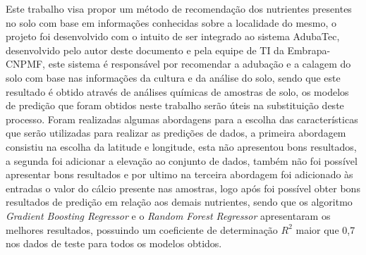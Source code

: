 \documentclass[
12pt,				%
oneside,			%
a4paper,			%
english,			%
french,				%
spanish,			%
brazil				%
]{abntex2}
\begin{document}
\pagebreak

\begin{resumo}
Este trabalho visa propor um método de recomendação dos nutrientes presentes no solo com base em informações conhecidas sobre a localidade do mesmo, o projeto foi desenvolvido com o intuito de ser integrado ao sistema AdubaTec, desenvolvido pelo autor deste documento e pela equipe de TI da Embrapa-CNPMF, este sistema é responsável por recomendar a adubação e a calagem do solo com base nas informações da cultura e da análise do solo, sendo que este resultado é obtido através de análises químicas de amostras de solo, os modelos de predição que foram obtidos neste trabalho serão úteis na substituição deste processo. Foram realizadas algumas abordagens para a escolha das características que serão utilizadas para realizar as predições de dados, a primeira abordagem consistiu na escolha da latitude e longitude, esta não apresentou bons resultados, a segunda foi adicionar a elevação ao conjunto de dados, também não foi possível apresentar bons resultados e por ultimo na terceira abordagem foi adicionado às entradas o valor do cálcio presente nas amostras, logo após foi possível obter bons resultados de predição em relação aos demais nutrientes, sendo que os algoritmo \textit{Gradient Boosting Regressor} e o \textit{Random Forest Regressor} apresentaram os melhores resultados, possuindo um coeficiente de determinação $R^2$ maior que 0,7 nos dados de teste para todos os modelos obtidos.    

\end{resumo}
\pagebreak
\end{document}
